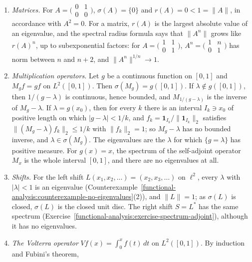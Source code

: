 \begin{example}\label{functional-analysis:example-spectra}
\begin{enumerate}
\item \emph{Matrices.} For $A = \bigl(\begin{smallmatrix}0 & 1\\ 0 & 0\end{smallmatrix}\bigr)$, $\sigma(A) = \{0\}$ and $r(A) = 0 < 1 = \|A\|$, in accordance with $A^2 = 0$. For a matrix, $r(A)$ is the largest absolute value
of an eigenvalue, and the spectral radius formula says that $\|A^n\|$ grows like $r(A)^n$, up to subexponential factors: for $A = \bigl(\begin{smallmatrix}1 & 1\\ 0 & 1\end{smallmatrix}\bigr)$,
$A^n = \bigl(\begin{smallmatrix}1 & n\\ 0 & 1\end{smallmatrix}\bigr)$ has norm between $n$ and $n + 2$, and $\|A^n\|^{1/n} \to 1$.
\item \emph{Multiplication operators.} Let $g$ be a continuous function on $[0, 1]$ and $M_gf = gf$ on $L^2([0, 1])$. Then $\sigma(M_g) = g([0, 1])$. If $\lambda \notin g([0, 1])$, then $1/(g - \lambda)$ is continuous,
hence bounded, and $M_{1/(g - \lambda)}$ is the inverse of $M_g - \lambda$. If $\lambda = g(x_0)$, then for every $k$ there is an interval $I_k \ni x_0$ of positive length on which $|g - \lambda| < 1/k$, and
$f_k = \mathbf{1}_{I_k}/\|\mathbf{1}_{I_k}\|_2$ satisfies $\|(M_g - \lambda)f_k\|_2 \leq 1/k$ with $\|f_k\|_2 = 1$; so $M_g - \lambda$ has no bounded inverse, and $\lambda \in \sigma(M_g)$. The eigenvalues are the $\lambda$
for which $\{g = \lambda\}$ has positive measure. For $g(x) = x$, the spectrum of the self-adjoint operator $M_x$ is the whole interval $[0, 1]$, and there are no eigenvalues at all.
\item \emph{Shifts.} For the left shift $L(x_1, x_2, \ldots) = (x_2, x_3, \ldots)$ on $\ell^2$, every $\lambda$ with $|\lambda| < 1$ is an eigenvalue (Counterexample~\ref{functional-analysis:counterexample-no-eigenvalues}(2)),
and $\|L\| = 1$; as $\sigma(L)$ is closed, $\sigma(L)$ is the closed unit disc. The right shift $S = L^*$ has the same spectrum (Exercise~\ref{functional-analysis:exercise-spectrum-adjoint}), although it has no
eigenvalues.
\item \emph{The Volterra operator} $Vf(x) = \int_0^xf(t)\,dt$ on $L^2([0, 1])$. By induction and Fubini's theorem,

\end{enumerate}
\end{example}
